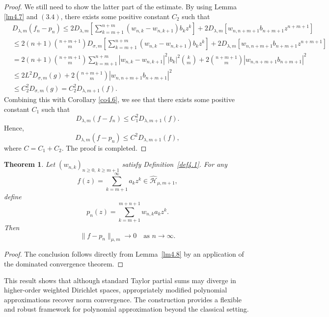 \documentclass[12pt,reqno]{amsart}
\newtheorem{theorem}{Theorem}[section]
\begin{document}
\begin{proof}
We still need to show the latter part of the estimate. By using Lemma \ref{lm4.7} and \((3.4)\), there exists some positive constant ${C_2}$ such that
\begin{align*}
&D_{\lambda ,m}(f_n - p_n)\le 2{D_{\lambda ,m}}\left[ {\sum\limits_{k = m+1}^{n + m} {({w_{n,k}} - {w_{n,k + 1}})} {b_k}{z^k}} \right] + 2{D_{\lambda ,m}}\left[ {{w_{n,n + m + 1}}{b_{n + m +1}}{z^{n + m + 1}}} \right] \\
&\le 2(n + 1) \binom{n+m+1}{m} D_{\sigma ,m} \left[ \sum_{k = m+1}^{n + m} (w_{n,k} - w_{n,k + 1}) b_k z^k \right] + 2{D_{\lambda ,m}}\left[ {{w_{n,n + m + 1}}{b_{n + m + 1}}{z^{n + m + 1}}} \right] \\
&= 2(n + 1) \binom{n+m+1}{m} \sum_{k = m+1}^{n + m}
|w_{n,k} - w_{n,k+1}|^2 |b_k|^2 \binom{k}{m} + 2\binom{n+m+1}{m}|w_{n,n+m+1} b_{n+m+1}|^{2}\\
&\le 2L^2 D_{\sigma ,m}(g) + 2\binom{n+m+1}{m}|w_{n,n+m+1} b_{n+m+1}|^{2}\\
&\le C_2^2{D_{\sigma ,m}}(g) = C_2^2{D_{\lambda ,m+1}}(f). \tag{3.8}
\end{align*}
Combining this with Corollary \ref{co4.6}, we see that there exists some positive constant ${C_1}$ such that
\begin{equation}
D_{\lambda ,m}(f - f_n) \le  C_1^2 D_{\lambda ,m+1}(f). \tag{3.9}
\end{equation}
Hence,
\[
D_{\lambda,m}(f - p_n) \le C^2 D_{\lambda,m+1}(f), \tag{3.10}
\]
where $C = {C_1} + {C_2}$. The proof is completed.
\end{proof}

\begin{theorem}\label{tm4.9}
Let $(w_{n,k})_{n\ge0,\;k\ge m+1}$ satisfy Definition~\ref{def4.1}.
For any
\[
f(z)=\sum_{k=m+1}^{\infty} a_k z^k \in \widehat{\mathcal{H}}_{\mu,m+1},
\]
define
\[
p_n(z)=\sum_{k=m+1}^{m+n+1} w_{n,k} a_k z^k.
\]
Then
\[
\|f-p_n\|_{\mu,m} \longrightarrow 0
\quad \text{as } n\to\infty.
\]
\end{theorem}

\begin{proof}
The conclusion follows directly from Lemma~\ref{lm4.8} by an application of the dominated convergence theorem.
\end{proof}

This result shows that although standard Taylor partial sums may diverge in
higher-order weighted Dirichlet spaces, appropriately modified polynomial
approximations recover norm convergence.
The construction provides a flexible and robust framework for polynomial
approximation beyond the classical setting.
\end{document}
